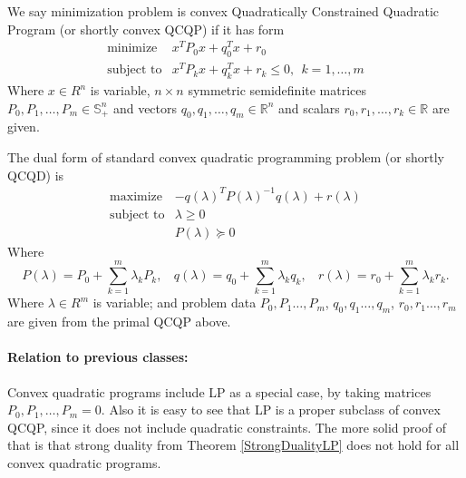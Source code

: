 \documentclass[10pt,oneside]{book}
\theoremstyle{definition}
\begin{document}
\label{defCQP}
We say minimization problem is convex Quadratically Constrained Quadratic Program (or shortly convex QCQP) if it has form
\begin{equation}
\label{QCQP} 
\begin{array}{ll}
\mbox{minimize} &x^TP_0x + q_0^Tx + r_0 \\
\mbox{subject to}& x^TP_kx + q_k^Tx + r_k \leq 0 , \ \ k = 1,\dots ,m  
\end{array} 
\tag{QCQP}
\end{equation}
Where $x\in R^n$ is variable, $n\times n$ symmetric semidefinite matrices $P_0,P_1,\dots ,P_m\in \mathbb{S}_+^n$ and vectors $q_0,q_1,\dots,q_m \in \mathbb{R}^n$ and scalars $r_0,r_1,\dots ,r_k\in \mathbb{R}$ are given.

\bigskip

The dual form of standard convex quadratic programming problem (or shortly QCQD) is 
\begin{equation}
\label{QCQD} 
\begin{array}{ll}
\mbox{maximize} & -q(\lambda)^TP(\lambda)^{-1}q(\lambda) + r(\lambda) \\
\mbox{subject to}&  \lambda \geq 0\\
& P(\lambda )\succeq 0
\end{array} 
\tag{QCQD}
\end{equation}
Where $$ P(\lambda) = P_0 + \sum_{k = 1}^m \lambda_kP_k, \ \ \ \  q(\lambda) = q_0 + \sum_{k = 1}^m \lambda_kq_k, \ \ \ \ r(\lambda) = r_0 + \sum_{k =1}^m \lambda_kr_k. $$
Where $\lambda\in R^m$ is variable; and problem data $P_0,P_1\dots ,P_m$, $q_0,q_1\dots ,q_m$, $r_0,r_1\dots , r_m$ are given from the primal QCQP above.
\bigskip

\paragraph{Relation to previous classes:}

Convex quadratic programs include LP as a special case, by taking matrices $P_0,P_1,\dots ,P_m = 0$.
Also it is easy to see that LP is a proper subclass of convex QCQP, since it does not include quadratic constraints. 
The more solid proof of that is that strong duality from Theorem \ref{StrongDualityLP} does not hold for all convex quadratic programs. 
\end{document}
